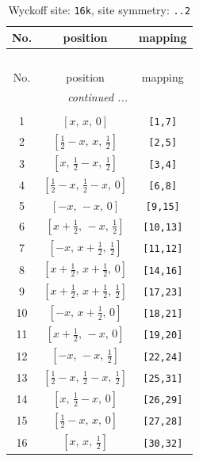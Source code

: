 \documentclass[fleqn,8pt]{jsarticle}
\begin{document}
\begin{longtable}{ccc}
\caption{Wyckoff site: {\tt 16k}, site symmetry: {\tt ..2}}
 \\
 \hline \hline
No. & position & mapping \\ \hline \endfirsthead

\multicolumn{2}{l}{\tablename\ \thetable{}} \\
 \hline \hline
No. & position & mapping \\ \hline \endhead

 \hline \hline
\multicolumn{2}{r}{\footnotesize\it continued ...} \\ \endfoot

 \hline \hline
\multicolumn{2}{r}{} \\ \endlastfoot

1 & $\left[ x,\, x,\, 0 \right]$ & {\tt [1,7]} \\ \hline
2 & $\left[ \frac{1}{2} - x,\, x,\, \frac{1}{2} \right]$ & {\tt [2,5]} \\ \hline
3 & $\left[ x,\, \frac{1}{2} - x,\, \frac{1}{2} \right]$ & {\tt [3,4]} \\ \hline
4 & $\left[ \frac{1}{2} - x,\, \frac{1}{2} - x,\, 0 \right]$ & {\tt [6,8]} \\ \hline
5 & $\left[ - x,\, - x,\, 0 \right]$ & {\tt [9,15]} \\ \hline
6 & $\left[ x + \frac{1}{2},\, - x,\, \frac{1}{2} \right]$ & {\tt [10,13]} \\ \hline
7 & $\left[ - x,\, x + \frac{1}{2},\, \frac{1}{2} \right]$ & {\tt [11,12]} \\ \hline
8 & $\left[ x + \frac{1}{2},\, x + \frac{1}{2},\, 0 \right]$ & {\tt [14,16]} \\ \hline
9 & $\left[ x + \frac{1}{2},\, x + \frac{1}{2},\, \frac{1}{2} \right]$ & {\tt [17,23]} \\ \hline
10 & $\left[ - x,\, x + \frac{1}{2},\, 0 \right]$ & {\tt [18,21]} \\ \hline
11 & $\left[ x + \frac{1}{2},\, - x,\, 0 \right]$ & {\tt [19,20]} \\ \hline
12 & $\left[ - x,\, - x,\, \frac{1}{2} \right]$ & {\tt [22,24]} \\ \hline
13 & $\left[ \frac{1}{2} - x,\, \frac{1}{2} - x,\, \frac{1}{2} \right]$ & {\tt [25,31]} \\ \hline
14 & $\left[ x,\, \frac{1}{2} - x,\, 0 \right]$ & {\tt [26,29]} \\ \hline
15 & $\left[ \frac{1}{2} - x,\, x,\, 0 \right]$ & {\tt [27,28]} \\ \hline
16 & $\left[ x,\, x,\, \frac{1}{2} \right]$ & {\tt [30,32]} \\
\end{longtable}
\end{document}
